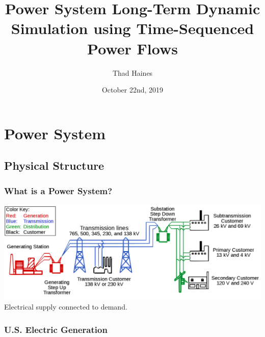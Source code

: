 \documentclass[14pt, unknownkeysallowed]{beamer}
\title{Power System Long-Term Dynamic Simulation using Time-Sequenced \\Power Flows}
\author{Thad Haines}
\institute[MT TECH]{Montana Technological University - Master's Thesis Research Project}
\date{October 22nd, 2019}
\begin{document}
	
\begin{frame}
	\titlepage
\end{frame}

\section{Power System}
\subsection{Physical Structure}
\begin{frame}
\frametitle{What is a Power System?}
\includegraphics[width=\linewidth]{largeGrid} %
Electrical supply connected to demand.\\
\end{frame}
\begin{frame}
\frametitle{U.S. Electric Generation}
\end{frame}
\end{document}
